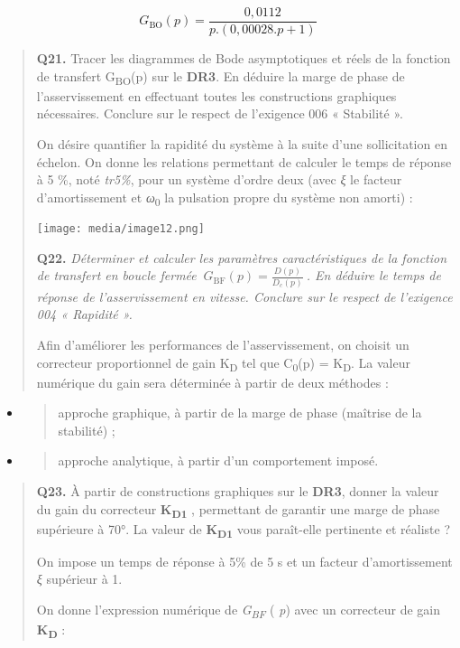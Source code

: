 \documentclass[]{article}
\begin{document}
\[G_{\text{BO}}\left( p \right) = \frac{0,0112}{p.(0,00028.p + 1)}\]

\begin{quote}
\textbf{Q21.} Tracer les diagrammes de Bode asymptotiques et réels de la
fonction de transfert G\textsubscript{BO}(p) sur le \textbf{DR3}. En
déduire la marge de phase de l'asservissement en effectuant toutes les
constructions graphiques nécessaires. Conclure sur le respect de
l'exigence 006 « Stabilité ».

On désire quantifier la rapidité du système à la suite d'une
sollicitation en échelon. On donne les relations permettant de calculer
le temps de réponse à 5 \%, noté \emph{tr5\%}, pour un système d'ordre
deux (avec \emph{ξ} le facteur d'amortissement et
\emph{ω}\textsubscript{0} la pulsation propre du système non amorti) :

\texttt{[image: media/image12.png]}

\textbf{Q22.} \emph{Déterminer et calculer les paramètres
caractéristiques de la fonction de transfert en boucle fermée}
\(\ G_{\text{BF}}(p) = \frac{D(p)}{D_{c}(p)}\ \)\emph{. En déduire le
temps de réponse de l'asservissement en vitesse. Conclure sur le respect
de l'exigence 004 « Rapidité ».}

Afin d'améliorer les performances de l'asservissement, on choisit un
correcteur proportionnel de gain K\textsubscript{D} tel que
C\textsubscript{0}(p) = K\textsubscript{D}. La valeur numérique du gain
sera déterminée à partir de deux méthodes :
\end{quote}

\begin{itemize}
\item
  \begin{quote}
  approche graphique, à partir de la marge de phase (maîtrise de la
  stabilité) ;
  \end{quote}
\item
  \begin{quote}
  approche analytique, à partir d'un comportement imposé.
  \end{quote}
\end{itemize}

\begin{quote}
\textbf{Q23.} À partir de constructions graphiques sur le \textbf{DR3},
donner la valeur du gain du correcteur \textbf{K\textsubscript{D1}} ,
permettant de garantir une marge de phase supérieure à 70°. La valeur de
\textbf{K\textsubscript{D1 }}vous paraît-elle pertinente et réaliste ?

On impose un temps de réponse à 5\% de 5 s et un facteur d'amortissement
\emph{ξ} supérieur à 1.

On donne l'expression numérique de \emph{G\textsubscript{BF}} (
\emph{p}) avec un correcteur de gain \textbf{K\textsubscript{D}} :
\end{quote}
\end{document}
